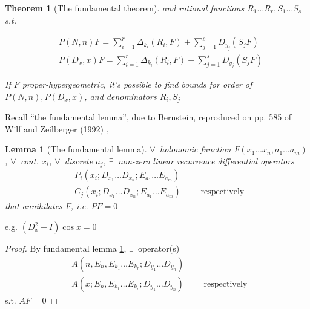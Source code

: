 \documentclass[10pt]{amsart}
\newtheorem{theorem}{Theorem}
\newtheorem{lemma}{Lemma}
\begin{document}
\begin{multicols*}{2}
\begin{theorem}[The fundamental theorem]
and rational functions $R_1 \dots R_r, S_1 \dots S_s$ s.t. 

\begin{equation}
\begin{aligned}
  & P(N,n)F = \sum_{i=1}^r \Delta_{k_i}(R_i, F) + \sum_{j=1}^s D_{y_j} (S_jF) \\ 
  & P(D_x,x)F = \sum_{i=1}^r \Delta_{k_i}(R_i, F) + \sum_{j=1}^s D_{y_j} (S_jF) 
\end{aligned}
\end{equation}

If $F$ proper-hypergeometric, it's possible to find bounds for order of $P(N,n), P(D_x,x)$, and denominators $R_i,S_j$


\end{theorem}

Recall ``the fundamental lemma'', due to Bernstein, reproduced on pp. 585 of Wilf and Zeilberger (1992) \cite{HWilfDZeilberger1992}, 
\begin{lemma}[The fundamental lemma]\label{lemma:fundamentallemma}
$\forall \, $ holonomic function $F(x_1 \dots x_n, a_1 \dots a_m)$, $\forall \, $ cont. $x_i$, $\forall \, $ discrete $a_j$, $\exists \, $ non-zero linear recurrence differential operators
\[
\begin{aligned}
  & P_i(x_i;D_{x_1} \dots D_{x_n}; E_{a_1} \dots E_{a_m}) \\ 
  &  C_j(x_i;D_{x_1} \dots D_{x_n}; E_{a_1} \dots E_{a_m}) \qquad \text{ respectively }
\end{aligned}
\]
that \emph{annihilates} $F$, i.e. $PF=0$
\end{lemma}
e.g. $(D_x^2 + I)\cos{x} = 0$

\begin{proof}
  By fundamental lemma \ref{lemma:fundamentallemma}, $\exists \, $ operator(s) 
\[
\begin{aligned} 
  & A(n,E_n,E_{k_1} \dots E_{k_r}; D_{y_1} \dots D_{y_n} ) \\ 
    & A(x;E_n,E_{k_1} \dots E_{k_r}; D_{y_1} \dots D_{y_n} ) \qquad \text{ respectively }
\end{aligned}
\]
s.t. $AF=0$


\end{proof}
\end{multicols*}
\end{document}
